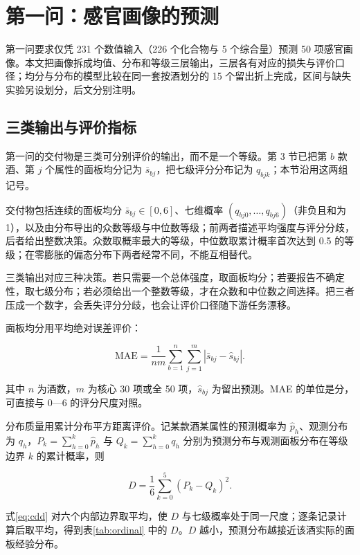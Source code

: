\section{第一问：感官画像的预测}\label{sec:q1}

第一问要求仅凭 231 个数值输入（226 个化合物与 5 个综合量）预测 50 项感官画像。本文把画像拆成均值、分布和等级三层输出，三层各有对应的损失与评价口径；均分与分布的模型比较在同一套按酒划分的 15 个留出折上完成，区间与缺失实验另设划分，后文分别注明。

\subsection{三类输出与评价指标}

第一问的交付物是三类可分别评价的输出，而不是一个等级。第 3 节已把第 $b$ 款酒、第 $j$ 个属性的面板均分记为 $\bar s_{bj}$，把七级评分分布记为 $q_{bjk}$；本节沿用这两组记号。

交付物包括连续的面板均分 $\bar s_{bj}\in[0,6]$、七维概率 $(q_{bj0},\ldots,q_{bj6})$（非负且和为 1），以及由分布导出的众数等级与中位数等级；前两者描述平均强度与评分分歧，后者给出整数决策。众数取概率最大的等级，中位数取累计概率首次达到 0.5 的等级；在零膨胀的偏态分布下两者经常不同，不能互相替代。

三类输出对应三种决策。若只需要一个总体强度，取面板均分；若要报告不确定性，取七级分布；若必须给出一个整数等级，才在众数和中位数之间选择。把三者压成一个数字，会丢失评分分歧，也会让评价口径随下游任务漂移。

面板均分用平均绝对误差评价：

\begin{equation}
\mathrm{MAE}=\frac{1}{nm}\sum_{b=1}^{n}\sum_{j=1}^{m}\left|\bar s_{bj}-\hat s_{bj}\right|.
\label{eq:mae}
\end{equation}

其中 $n$ 为酒数，$m$ 为核心 30 项或全 50 项，$\hat s_{bj}$ 为留出预测。MAE 的单位是分，可直接与 0—6 的评分尺度对照。

分布质量用累计分布平方距离评价。记某款酒某属性的预测概率为 $\hat p_h$、观测分布为 $q_h$，$P_k=\sum_{h=0}^{k}\hat p_h$ 与 $Q_k=\sum_{h=0}^{k}q_h$ 分别为预测分布与观测面板分布在等级边界 $k$ 的累计概率，则

\begin{equation}
D=\frac{1}{6}\sum_{k=0}^{5}\left(P_k-Q_k\right)^2.
\label{eq:cdd}
\end{equation}

式\eqref{eq:cdd} 对六个内部边界取平均，使 $D$ 与七级概率处于同一尺度；逐条记录计算后取平均，得到表\ref{tab:ordinal} 中的 $D$。$D$ 越小，预测分布越接近该酒实际的面板经验分布。

